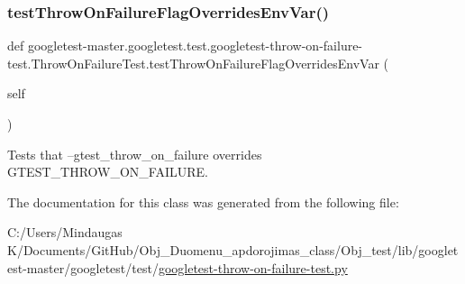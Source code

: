 \subsubsection{\texorpdfstring{testThrowOnFailureFlagOverridesEnvVar()}{testThrowOnFailureFlagOverridesEnvVar()}}
{\footnotesize\ttfamily def googletest-\/master.\+googletest.\+test.\+googletest-\/throw-\/on-\/failure-\/test.\+Throw\+On\+Failure\+Test.\+test\+Throw\+On\+Failure\+Flag\+Overrides\+Env\+Var (\begin{DoxyParamCaption}\item[{}]{self }\end{DoxyParamCaption})}

\begin{DoxyVerb}Tests that --gtest_throw_on_failure overrides GTEST_THROW_ON_FAILURE.\end{DoxyVerb}
 

The documentation for this class was generated from the following file\+:\begin{DoxyCompactItemize}
\item 
C\+:/\+Users/\+Mindaugas K/\+Documents/\+Git\+Hub/\+Obj\+\_\+\+Duomenu\+\_\+apdorojimas\+\_\+class/\+Obj\+\_\+test/lib/googletest-\/master/googletest/test/\mbox{\hyperlink{_obj__test_2lib_2googletest-master_2googletest_2test_2googletest-throw-on-failure-test_8py}{googletest-\/throw-\/on-\/failure-\/test.\+py}}\end{DoxyCompactItemize}
